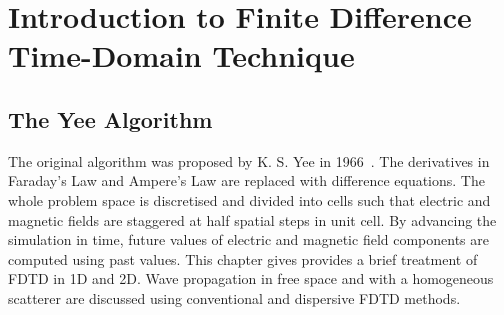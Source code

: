\chapter{Introduction to Finite Difference Time-Domain Technique}
\section{The Yee Algorithm}
The original algorithm was proposed by K. S. Yee in 1966~\cite{Yee1966}. The derivatives in Faraday's Law and Ampere's Law are replaced with difference equations. The whole problem space is discretised and divided into cells such that electric and magnetic fields are staggered at half spatial steps in unit cell. By advancing the simulation in time, future values of electric and magnetic field components are computed using past values. This chapter gives provides a brief treatment of FDTD in 1D and 2D. Wave propagation in free space and with a homogeneous scatterer are discussed using conventional and dispersive FDTD methods.
